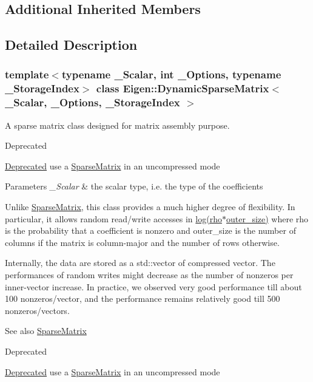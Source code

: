 \subsection*{Additional Inherited Members}


\subsection{Detailed Description}
\subsubsection*{template$<$typename \+\_\+\+Scalar, int \+\_\+\+Options, typename \+\_\+\+Storage\+Index$>$\newline
class Eigen\+::\+Dynamic\+Sparse\+Matrix$<$ \+\_\+\+Scalar, \+\_\+\+Options, \+\_\+\+Storage\+Index $>$}

A sparse matrix class designed for matrix assembly purpose. 

\begin{DoxyRefDesc}{Deprecated}
\item[\hyperlink{deprecated__deprecated000040}{Deprecated}]use a \hyperlink{group___sparse_core___module_class_eigen_1_1_sparse_matrix}{Sparse\+Matrix} in an uncompressed mode\end{DoxyRefDesc}



\begin{DoxyParams}{Parameters}
{\em \+\_\+\+Scalar} & the scalar type, i.\+e. the type of the coefficients\\
\hline
\end{DoxyParams}
Unlike \hyperlink{group___sparse_core___module_class_eigen_1_1_sparse_matrix}{Sparse\+Matrix}, this class provides a much higher degree of flexibility. In particular, it allows random read/write accesses in \hyperlink{structlog}{log(rho$\ast$outer\+\_\+size)} where {\ttfamily rho} is the probability that a coefficient is nonzero and outer\+\_\+size is the number of columns if the matrix is column-\/major and the number of rows otherwise.

Internally, the data are stored as a std\+::vector of compressed vector. The performances of random writes might decrease as the number of nonzeros per inner-\/vector increase. In practice, we observed very good performance till about 100 nonzeros/vector, and the performance remains relatively good till 500 nonzeros/vectors.

\begin{DoxySeeAlso}{See also}
\hyperlink{group___sparse_core___module_class_eigen_1_1_sparse_matrix}{Sparse\+Matrix}
\end{DoxySeeAlso}
\begin{DoxyRefDesc}{Deprecated}
\item[\hyperlink{deprecated__deprecated000084}{Deprecated}]use a \hyperlink{group___sparse_core___module_class_eigen_1_1_sparse_matrix}{Sparse\+Matrix} in an uncompressed mode\end{DoxyRefDesc}




